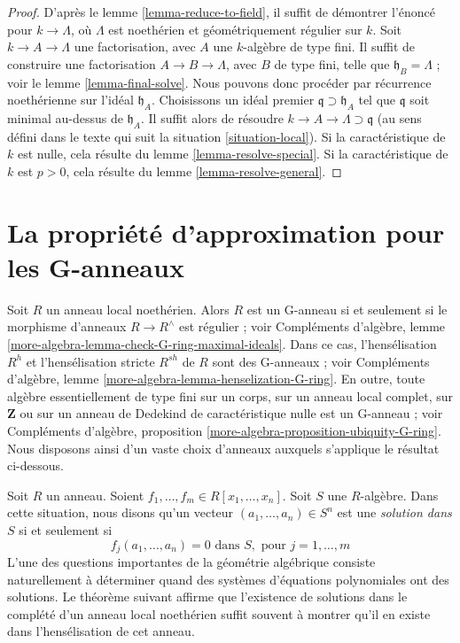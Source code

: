\begin{proof}
D'après le lemme \ref{lemma-reduce-to-field},
il suffit de démontrer l'énoncé pour $k \to \Lambda$,
où $\Lambda$ est noethérien et géométriquement régulier sur $k$.
Soit $k \to A \to \Lambda$ une factorisation, avec $A$ une
$k$-algèbre de type fini. Il suffit de construire une factorisation
$A \to B \to \Lambda$, avec $B$ de type fini, telle que
$\mathfrak h_B = \Lambda$ ; voir le lemme \ref{lemma-final-solve}.
Nous pouvons donc procéder par récurrence noethérienne sur l'idéal
$\mathfrak h_A$. Choisissons un idéal premier
$\mathfrak q \supset \mathfrak h_A$ tel que
$\mathfrak q$ soit minimal au-dessus de $\mathfrak h_A$.
Il suffit alors de résoudre $k \to A \to \Lambda \supset \mathfrak q$
(au sens défini dans le texte qui suit la situation \ref{situation-local}).
Si la caractéristique de $k$ est nulle, cela résulte du
lemme \ref{lemma-resolve-special}.
Si la caractéristique de $k$ est $p > 0$, cela résulte du
lemme \ref{lemma-resolve-general}.
\end{proof}




\section{La propriété d'approximation pour les G-anneaux}
\label{section-approximation-G-rings}

\noindent
Soit $R$ un anneau local noethérien. Alors $R$ est un G-anneau si et
seulement si le morphisme d'anneaux $R \to R^\wedge$ est régulier ; voir
Compléments d'algèbre, lemme
\ref{more-algebra-lemma-check-G-ring-maximal-ideals}.
Dans ce cas, l'hensélisation $R^h$ et l'hensélisation stricte
$R^{sh}$ de $R$ sont des G-anneaux ; voir
Compléments d'algèbre, lemme
\ref{more-algebra-lemma-henselization-G-ring}.
En outre, toute algèbre essentiellement de type fini sur un corps, sur un
anneau local complet, sur $\mathbf{Z}$ ou sur un anneau de Dedekind de
caractéristique nulle est un G-anneau ; voir
Compléments d'algèbre, proposition
\ref{more-algebra-proposition-ubiquity-G-ring}.
Nous disposons ainsi d'un vaste choix d'anneaux auxquels s'applique le
résultat ci-dessous.

\medskip\noindent
Soit $R$ un anneau. Soient $f_1, \ldots, f_m \in R[x_1, \ldots, x_n]$.
Soit $S$ une $R$-algèbre. Dans cette situation, nous disons qu'un vecteur
$(a_1, \ldots, a_n) \in S^n$ est une {\it solution dans $S$}
si et seulement si
$$
f_j(a_1, \ldots, a_n) = 0 \text{ dans } S, \text{ pour }
j = 1, \ldots, m
$$
L'une des questions importantes de la géométrie algébrique consiste
naturellement à déterminer quand des systèmes d'équations polynomiales
ont des solutions. Le théorème suivant affirme que l'existence de solutions
dans le complété d'un anneau local noethérien suffit souvent à montrer
qu'il en existe dans l'hensélisation de cet anneau.

